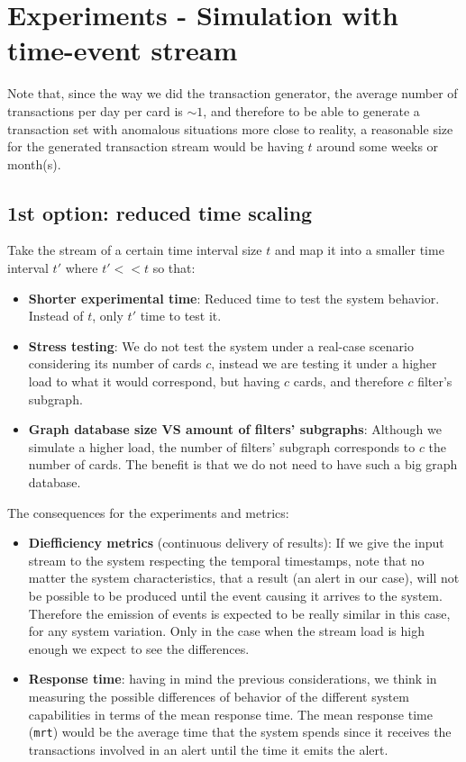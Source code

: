 \documentclass{article}
\begin{document}
\section{Experiments - Simulation with time-event stream}

Note that, since the way we did the transaction generator, the average number of transactions per day per card is $\sim1$, and therefore to be able to generate a transaction set with anomalous situations more close to reality, a reasonable size for the generated transaction stream would be having $t$ around some weeks or month(s).

\subsection{1st option: reduced time scaling}

Take the stream of a certain time interval size $t$ and map it into a smaller time interval
$t'$ where $t' << t$ so that:
\begin{itemize}
  \item \textbf{Shorter experimental time}: Reduced time to test the system behavior. Instead of $t$, only $t'$ time to test it. 
  \item \textbf{Stress testing}: We do not test the system under a real-case scenario considering its number of cards $c$, instead we are testing it under a higher load to what it would correspond, but having $c$ cards, and therefore $c$ filter's subgraph.
  \item \textbf{Graph database size VS amount of filters' subgraphs}: Although we simulate a higher load, the number of filters' subgraph corresponds to $c$ the number of cards. The benefit is that we do not need to have such a big graph database.
\end{itemize}

The consequences for the experiments and metrics:

\begin{itemize}
  \item \textbf{Diefficiency metrics} (continuous delivery of results): If we give the input stream to the system respecting the temporal timestamps, note that no matter the system characteristics, that a result (an alert in our case), will not be possible to be produced until the event causing it arrives to the system. Therefore the emission of events is expected to be really similar in this case, for any system variation. Only in the case when the stream load is high enough we expect to see the differences.
  \item \textbf{Response time}: having in mind the previous considerations, we think in measuring the possible differences of behavior of the different system capabilities in terms of the mean response time. The mean response time (\texttt{mrt}) would be the average time that the system spends since it receives the transactions involved in an alert until the time it emits the alert.
\end{itemize}
\end{document}
